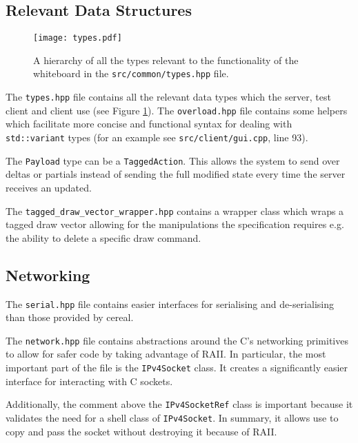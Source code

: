 \documentclass[article]{uom-coursework}
\begin{document}
\subsection{Relevant Data Structures}

\begin{figure}[H]
\centering
\begin{mdframed}[backgroundcolor=OffWhite]
\texttt{[image: types.pdf]}
\end{mdframed}
\caption{A hierarchy of all the types relevant to the
functionality of the whiteboard in the
\texttt{src/common/types.hpp} file.}
\label{fig:typetree}
\end{figure}

The \texttt{types.hpp} file contains all the relevant data types
which the server, test client and client use (see Figure
\ref{fig:typetree}). The \texttt{overload.hpp} file contains
some helpers which facilitate more concise and functional syntax
for dealing with \texttt{std::variant} types (for an example see
\texttt{src/client/gui.cpp}, line 93).

\begin{note}
    The \texttt{Payload} type can be a \texttt{TaggedAction}.
    This allows the system to send over deltas or partials
    instead of sending the full modified state every time the
    server receives an updated.
\end{note}

The \texttt{tagged\_draw\_vector\_wrapper.hpp} contains a
wrapper class which wraps a tagged draw vector allowing for the
manipulations the specification requires e.g. the ability to
delete a specific draw command.

\subsection{Networking}

The \texttt{serial.hpp} file contains easier interfaces for
serialising and de-serialising than those provided by cereal.

The \texttt{network.hpp} file contains abstractions around the
C's networking primitives to allow for safer code by taking
advantage of RAII. In particular, the most important part of the
file is the \texttt{IPv4Socket} class. It creates a significantly
easier interface for interacting with C sockets.

Additionally, the comment above the \texttt{IPv4SocketRef}
class is important because it validates the need for a
shell class of \texttt{IPv4Socket}. In summary, it allows
use to copy and pass the socket without destroying
it because of RAII.
\end{document}
